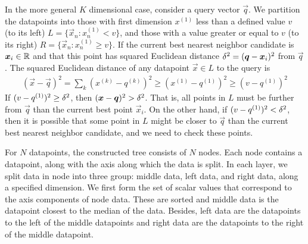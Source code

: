 In the more general $K$ dimensional case, consider a query vector $\vec{q}$. We partition the datapoints into those with first dimension $x^{(1)}$ less than a defined value $v$ (to its left) $L=\{\vec{x}_n:x_n^{(1)}<v\}$, and those with a value greater or equal to $v$ (to its right) $R=\{\vec{x}_n:x_n^{(1)}\geq v\}$. If the current best nearest neighbor candidate is $\boldsymbol{x}_i\in\mathbb{R}$ and that this point has squared Euclidean distance $\delta^2=(\boldsymbol{q}-\boldsymbol{x}_i)^2$ from $\vec{q}$. The squared Euclidean distance of any datapoint $\vec{x}\in L$ to the query is
\begin{align*}
	(\vec{x}-\vec{q})^2=\sum_k(x^{(k)}-q^{(k)})^2\geq(x^{(1)}-q^{(1)})^2\geq(v-q^{(1)})^2
\end{align*}
If $(v-q^{(1)})^2\geq\delta^2$, then $(\boldsymbol{x}-\boldsymbol{q})^2>\delta^2$. That is, all points in $L$ must be further from $\vec{q}$ than the current best point $\vec{x}_i$. On the other hand, if $(v-q^{(1)})^2<\delta^2$, then it is possible that some point in $L$ might be closer to $\vec{q}$ than the current best nearest neighbor candidate, and we need to check these points.

For $N$ datapoints, the constructed tree consists of $N$ nodes. Each node contains a datapoint, along with the axis along which the data is split. In each layer, we split data in node into three group: middle data, left data, and right data, along a specified dimension. We first form the set of scalar values that correspond to the axis components of node data. These are sorted and middle data is the datapoint closest to the median of the data. Besides, left data are the datapoints to the left of the middle datapoints and right data are the datapoints to the right of the middle datapoint.
